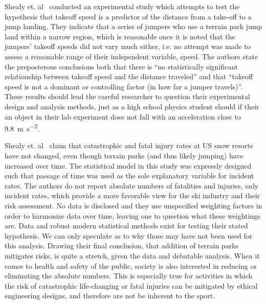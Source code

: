 \documentclass[smallextended]{svjour3}       %
\begin{document}
Shealy et. al~\cite{Shealy2010} conducted an experimental study which attempts
to test the hypothesis that takeoff speed is a predictor of the distance from a
take-off to a jump landing. They indicate that a series of jumpers who use a
terrain park jump land within a narrow region, which is reasonable once it is
noted that the jumpers' takeoff speeds did not vary much either, i.e. no
attempt was made to assess a reasonable range of their independent variable,
speed. The authors state the preposterous conclusions both that there is ``no
statistically significant relationship between takeoff speed and the distance
traveled'' and that ``takeoff speed is not a dominant or controlling factor (in
how far a jumper travels)''. These results should lead the careful researcher
to question their experimental design and analysis methods, just as a high
school physics student should if their an object in their lab experiment does
not fall with an acceleration close to 9.8~\si{\meter\per\second\squared}.

Shealy et. al~\cite{Shealy2015} claim that catastrophic and fatal injury rates
at US snow resorts have not changed, even though terrain parks (and thus likely
jumping) have increased over time. The statistical model in this study was
expressly designed such that passage of time was used as the sole explanatory
variable for incident rates. The authors do not report absolute numbers of
fatalities and injuries, only incident rates, which provide a more favorable
view for the ski industry and their risk assessment. No data is disclosed and
they use unspecified weighting factors in order to harmonize data over time,
leaving one to question what these weightings are. Data and robust modern
statistical methods exist for testing their stated hypothesis. We can only
speculate as to why those may have not been used for this analysis. Drawing
their final conclusion, that addition of terrain parks mitigates risks, is
quite a stretch, given the data and debatable analysis. When it comes to health
and safety of the public, society is also interested in reducing or eliminating
the absolute numbers.  This is especially true for activities in which the risk
of catastrophic life-changing or fatal injuries can be mitigated by ethical
engineering designs, and therefore are not be inherent to the sport.
\end{document}
